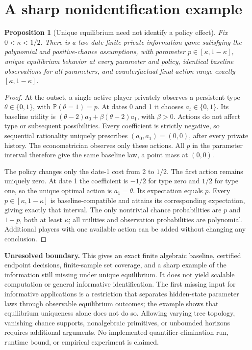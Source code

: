 \documentclass[11pt]{article}
\newtheorem{proposition}[theorem]{Proposition}
\theoremstyle{remark}\newtheorem{remark}[theorem]{Remark}
\newcommand{\Prb}{\mathbb P}
\begin{document}
\section*{A sharp nonidentification example}
\begin{proposition}[Unique equilibrium need not identify a policy effect]\label{prop:example}
Fix $0<\kappa<1/2$. There is a two-date finite private-information game satisfying the polynomial and positive-chance assumptions, with parameter $p\in[\kappa,1-\kappa]$, unique equilibrium behavior at every parameter and policy, identical baseline observations for all parameters, and counterfactual final-action range exactly $[\kappa,1-\kappa]$.
\end{proposition}
\begin{proof}
At the outset, a single active player privately observes a persistent type $\theta\in\{0,1\}$, with $\Prb(\theta=1)=p$. At dates 0 and 1 it chooses $a_t\in\{0,1\}$. Its baseline utility is
$(\theta-2)a_0+\beta(\theta-2)a_1$, with $\beta>0$. Actions do not affect type or subsequent possibilities. Every coefficient is strictly negative, so sequential rationality uniquely prescribes $(a_0,a_1)=(0,0)$, after every private history. The econometrician observes only these actions. All $p$ in the parameter interval therefore give the same baseline law, a point mass at $(0,0)$.

The policy changes only the date-1 cost from 2 to $1/2$. The first action remains uniquely zero. At date 1 the coefficient is $-1/2$ for type zero and $1/2$ for type one, so the unique optimal action is $a_1=\theta$. Its expectation equals $p$. Every $p\in[\kappa,1-\kappa]$ is baseline-compatible and attains its corresponding expectation, giving exactly that interval. The only nontrivial chance probabilities are $p$ and $1-p$, both at least $\kappa$; all utilities and observation probabilities are polynomial. Additional players with one available action can be added without changing any conclusion.
\end{proof}

\textbf{Unresolved boundary.} This gives an exact finite algebraic baseline, certified endpoint decisions, finite-sample set coverage, and a sharp example of the information still missing under unique equilibrium. It does not yield scalable computation or general informative identification. The first missing input for informative applications is a restriction that separates hidden-state parameter laws through observable equilibrium outcomes; the example shows that equilibrium uniqueness alone does not do so. Allowing varying tree topology, vanishing chance supports, nonalgebraic primitives, or unbounded horizons requires additional arguments. No implemented quantifier-elimination run, runtime bound, or empirical experiment is claimed.
\end{document}
